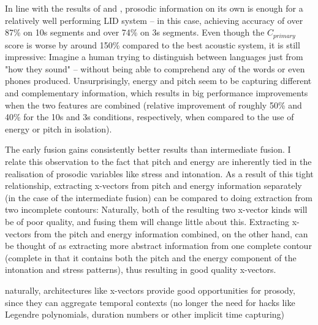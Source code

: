 \documentclass[bsc,frontabs,twoside,singlespacing,parskip,deptreport]{infthesis}
\begin{document}
{{    %
    In line with the results of \citet{Lin_et_al_2005} and \citet{Martinez_et_al_2012}, prosodic information on its own is enough for a relatively well performing LID system -- in this case, achieving accuracy of over 87\% on 10s segments and over 74\% on 3s segments.
    Even though the $C_{primary}$ score is worse by around 150\% compared to the best acoustic system, it is still impressive: Imagine a human trying to distinguish between languages just from "how they sound" -- without being able to comprehend any of the words or even phones produced.
    Unsurprisingly, energy and pitch seem to be capturing different and complementary information, which results in big performance improvements when the two features are combined (relative improvement of roughly 50\% and 40\% for the 10s and 3s conditions, respectively, when compared to the use of energy or pitch in isolation).
    
    The early fusion gains consistently better results than intermediate fusion. I relate this observation to the fact that pitch and energy are inherently tied in the realisation of prosodic variables like stress and intonation. As a result of this tight relationship, extracting x-vectors from pitch and energy information separately (in the case of the intermediate fusion) can be compared to doing extraction from two incomplete contours: Naturally, both of the resulting two x-vector kinds will be of poor quality, and fusing them will change little about this. Extracting x-vectors from the pitch and energy information combined, on the other hand, can be thought of as extracting more abstract information from one complete contour (complete in that it contains both the pitch and the energy component of the intonation and stress patterns), thus resulting in good quality x-vectors.


    naturally, architectures like x-vectors provide good opportunities for prosody, since they can aggregate temporal contexts (no longer the need for hacks like Legendre polynomials, duration numbers or other implicit time capturing)

}}
\end{document}
